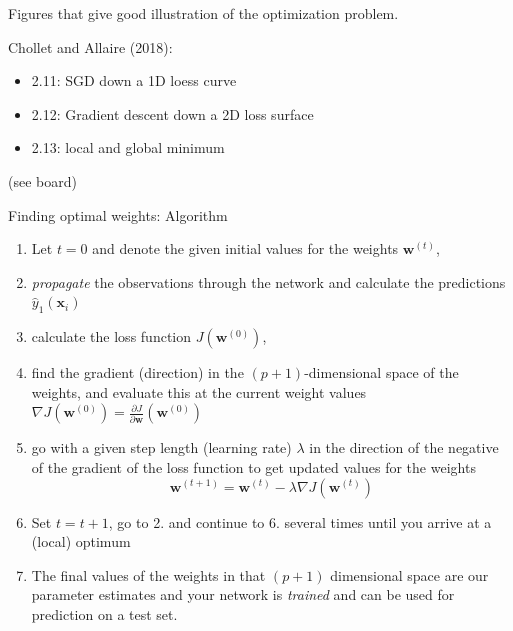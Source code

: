 \documentclass[10pt,ignorenonframetext,]{beamer}
\providecommand{\tightlist}{%
  \setlength{\itemsep}{0pt}\setlength{\parskip}{0pt}}
\begin{document}
\begin{frame}

Figures that give good illustration of the optimization problem.

Chollet and Allaire (2018):

\begin{itemize}
\tightlist
\item
  2.11: SGD down a 1D loess curve
\item
  2.12: Gradient descent down a 2D loss surface
\item
  2.13: local and global minimum
\end{itemize}

(see board)

\end{frame}

\begin{frame}

\begin{block}{Finding optimal weights: Algorithm}

\begin{enumerate}
\def\labelenumi{\arabic{enumi}.}
\tightlist
\item
  Let \(t=0\) and denote the given initial values for the weights
  \({\boldsymbol w}^{(t)}\),
\item
  \emph{propagate} the observations through the network and calculate
  the predictions \({\hat{y}_1({\boldsymbol x}_i)}\)
\item
  calculate the loss function \(J({\boldsymbol w}^{(0)})\),
\item
  find the gradient (direction) in the \((p+1)\)-dimensional space of
  the weights, and evaluate this at the current weight values
  \(\nabla J({\boldsymbol w}^{(0)})={\frac{\partial J}{\partial {\boldsymbol w}}}({\boldsymbol w}^{(0)})\)
\item
  go with a given step length (learning rate) \(\lambda\) in the
  direction of the negative of the gradient of the loss function to get
  updated values for the weights
  \[{\boldsymbol w}^{(t+1)}={\boldsymbol w}^{(t)} - \lambda \nabla J({\boldsymbol w}^{(t)})\]
\item
  Set \(t=t+1\), go to 2. and continue to 6. several times until you
  arrive at a (local) optimum
\item
  The final values of the weights in that \((p+1)\) dimensional space
  are our parameter estimates and your network is \emph{trained} and can
  be used for prediction on a test set.
\end{enumerate}

\end{block}

\end{frame}
\end{document}

